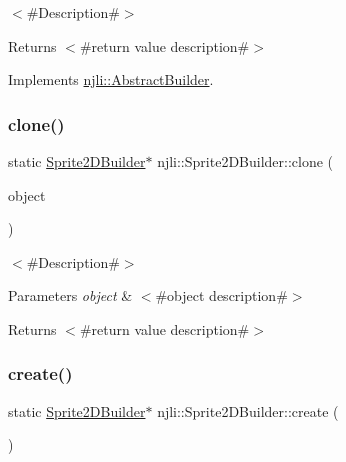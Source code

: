 $<$\#\+Description\#$>$

\begin{DoxyReturn}{Returns}
$<$\#return value description\#$>$ 
\end{DoxyReturn}


Implements \mbox{\hyperlink{classnjli_1_1_abstract_builder_aa1d220053e182c37b31b427499c6eacf}{njli\+::\+Abstract\+Builder}}.

\mbox{\label{classnjli_1_1_sprite2_d_builder_ae1bafb46b2edf1d64ff578d99bf1c3ed}} 
\subsubsection{\texorpdfstring{clone()}{clone()}}
{\footnotesize\ttfamily static \mbox{\hyperlink{classnjli_1_1_sprite2_d_builder}{Sprite2\+D\+Builder}}$\ast$ njli\+::\+Sprite2\+D\+Builder\+::clone (\begin{DoxyParamCaption}\item[{const \mbox{\hyperlink{classnjli_1_1_sprite2_d_builder}{Sprite2\+D\+Builder}} \&}]{object }\end{DoxyParamCaption})\hspace{0.3cm}{\ttfamily [static]}}

$<$\#\+Description\#$>$


\begin{DoxyParams}{Parameters}
{\em object} & $<$\#object description\#$>$\\
\hline
\end{DoxyParams}
\begin{DoxyReturn}{Returns}
$<$\#return value description\#$>$ 
\end{DoxyReturn}
\mbox{\label{classnjli_1_1_sprite2_d_builder_aacf13bcd07b7ae227754dc774967be8d}} 
\subsubsection{\texorpdfstring{create()}{create()}}
{\footnotesize\ttfamily static \mbox{\hyperlink{classnjli_1_1_sprite2_d_builder}{Sprite2\+D\+Builder}}$\ast$ njli\+::\+Sprite2\+D\+Builder\+::create (\begin{DoxyParamCaption}{ }\end{DoxyParamCaption})\hspace{0.3cm}{\ttfamily [static]}}

